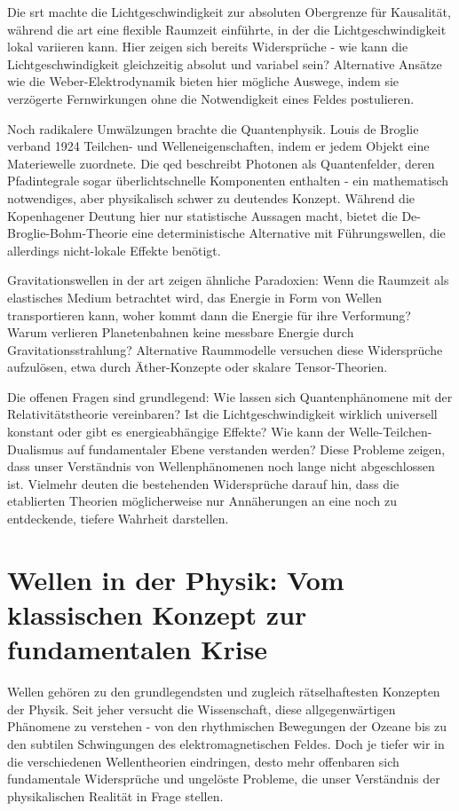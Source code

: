 Die \gls{srt} machte die Lichtgeschwindigkeit zur absoluten Obergrenze für Kausalität, während die \gls{art} eine flexible Raumzeit einführte, in der die
Lichtgeschwindigkeit lokal variieren kann. Hier zeigen sich bereits Widersprüche - wie kann die Lichtgeschwindigkeit gleichzeitig absolut und variabel sein?
Alternative Ansätze wie die Weber-Elektrodynamik bieten hier mögliche Auswege, indem sie verzögerte Fernwirkungen ohne die Notwendigkeit eines
Feldes postulieren.

Noch radikalere Umwälzungen brachte die Quantenphysik. Louis de Broglie verband 1924 Teilchen- und Welleneigenschaften, indem er jedem Objekt eine Materiewelle zuordnete.
Die \gls{qed} beschreibt Photonen als Quantenfelder, deren Pfadintegrale sogar überlichtschnelle Komponenten enthalten - ein mathematisch notwendiges,
aber physikalisch schwer zu deutendes Konzept. Während die Kopenhagener Deutung hier nur statistische Aussagen macht, bietet die De-Broglie-Bohm-Theorie eine deterministische
Alternative mit Führungswellen, die allerdings nicht-lokale Effekte benötigt.

Gravitationswellen in der \gls{art} zeigen ähnliche Paradoxien: Wenn die Raumzeit als elastisches Medium betrachtet wird, das Energie in Form von Wellen transportieren kann, woher kommt
dann die Energie für ihre Verformung? Warum verlieren Planetenbahnen keine messbare Energie durch Gravitationsstrahlung? Alternative Raummodelle versuchen diese Widersprüche aufzulösen,
etwa durch Äther-Konzepte oder skalare Tensor-Theorien.

Die offenen Fragen sind grundlegend: Wie lassen sich Quantenphänomene mit der Relativitätstheorie vereinbaren? Ist die Lichtgeschwindigkeit wirklich universell konstant oder gibt es
energieabhängige Effekte? Wie kann der Welle-Teilchen-Dualismus auf fundamentaler Ebene verstanden werden? Diese Probleme zeigen, dass unser Verständnis von Wellenphänomenen noch lange
nicht abgeschlossen ist. Vielmehr deuten die bestehenden Widersprüche darauf hin, dass die etablierten Theorien möglicherweise nur Annäherungen an eine noch zu entdeckende, tiefere
Wahrheit darstellen.

\section{Wellen in der Physik: Vom klassischen Konzept zur fundamentalen Krise}
Wellen gehören zu den grundlegendsten und zugleich rätselhaftesten Konzepten der Physik. Seit jeher versucht die Wissenschaft, diese allgegenwärtigen Phänomene zu verstehen - von den
rhythmischen Bewegungen der Ozeane bis zu den subtilen Schwingungen des elektromagnetischen Feldes. Doch je tiefer wir in die verschiedenen Wellentheorien eindringen, desto mehr offenbaren
sich fundamentale Widersprüche und ungelöste Probleme, die unser Verständnis der physikalischen Realität in Frage stellen.

